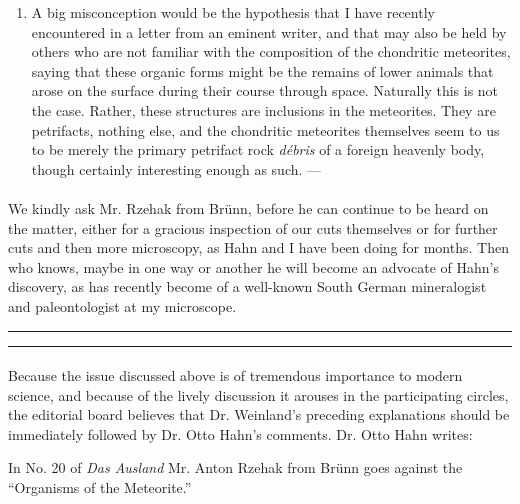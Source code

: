 \documentclass[a4paper, 12pt, oneside]{article}
\begin{document}
\begin{enumerate}
\item A big misconception would be the hypothesis that I have recently encountered in a letter from an eminent writer, and that may also be held by others who are not familiar with the composition of the chondritic meteorites, saying that these organic forms might be the remains of lower animals that arose on the surface during their course through space. Naturally this is not the case. Rather, these structures are inclusions in the meteorites. They are petrifacts, nothing else, and the chondritic meteorites themselves seem to us to be merely the primary petrifact rock \emph{débris} of a foreign heavenly body, though certainly interesting enough as such. ---
\end{enumerate}
\paragraph*{}
We kindly ask Mr. Rzehak from Brünn, before he can continue to be heard on the matter, either for a gracious inspection of our cuts themselves or for further cuts and then more microscopy, as Hahn and I have been doing for months. Then who knows, maybe in one way or another he will become an advocate of Hahn's discovery, as has recently become of a well-known South German mineralogist and paleontologist at my microscope.

\hspace*{-6mm}\rule{\textwidth}{1.6pt}\vspace*{-\baselineskip}\vspace*{2pt} %
\hspace*{0mm}\rule{\textwidth}{0.4pt} %

\paragraph*{}
Because the issue discussed above is of tremendous importance to modern science, and because of the lively discussion it arouses in the participating circles, the editorial board believes that Dr. Weinland's preceding explanations should be immediately followed by Dr. Otto Hahn's comments. Dr. Otto Hahn writes:

In No. 20 of \emph{Das Ausland} Mr. Anton Rzehak from Brünn goes against the ``Organisms of the Meteorite.''
\end{document}

